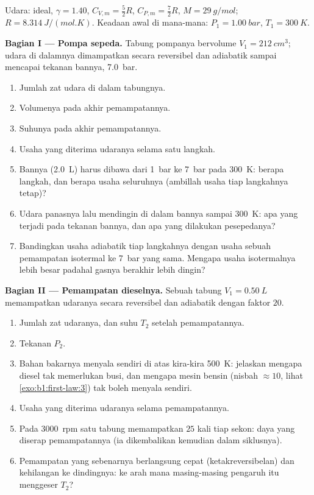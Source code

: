 \begin{problem}
\label{pb:b1:first-law:1}
Udara:  ideal, $\gamma = 1.40$, $C_{V,m} = \tfrac52 R$, $C_{P,m} =
\tfrac72 R$, $M = \qty{29}{g/mol}$; $R = \qty{8.314}{J/(mol.K)}$. Keadaan
awal di mana-mana: $P_1 = \qty{1.00}{bar}$, $T_1 = \qty{300}{K}$.

\medskip
\noindent\textbf{Bagian I --- Pompa sepeda.}
Tabung pompanya bervolume $V_1 = \qty{212}{cm^3}$; udara di dalamnya
dimampatkan secara reversibel dan adiabatik sampai mencapai tekanan
bannya, \qty{7.0}{bar}.
\begin{enumerate}
  \item Jumlah zat udara di dalam tabungnya.
  \item Volumenya pada akhir pemampatannya.
  \item Suhunya pada akhir pemampatannya.
  \item Usaha yang diterima udaranya selama satu langkah.
  \item Bannya (\qty{2.0}{L}) harus dibawa dari \qty{1}{bar} ke
        \qty{7}{bar} pada \qty{300}{K}: berapa langkah, dan berapa usaha
        seluruhnya (ambillah usaha tiap langkahnya tetap)?
  \item Udara panasnya lalu mendingin di dalam bannya sampai \qty{300}{K}: apa yang terjadi
        pada tekanan bannya, dan apa yang dilakukan pesepedanya?
  \item Bandingkan usaha adiabatik tiap langkahnya dengan usaha sebuah
        pemampatan isotermal ke \qty{7}{bar} yang sama. Mengapa usaha
        isotermalnya lebih besar padahal gasnya berakhir lebih dingin?
\end{enumerate}

\medskip
\noindent\textbf{Bagian II --- Pemampatan dieselnya.}
Sebuah tabung $V_1 = \qty{0.50}{L}$ memampatkan udaranya secara reversibel dan
adiabatik dengan faktor $20$.
\begin{enumerate}[resume]
  \item Jumlah zat udaranya, dan suhu $T_2$ setelah pemampatannya.
  \item Tekanan $P_2$.
  \item Bahan bakarnya menyala sendiri di atas kira-kira \qty{500}{K}: jelaskan mengapa
        diesel tak memerlukan busi, dan mengapa mesin bensin (nisbah
        $\approx 10$, lihat \cref{exo:b1:first-law:3}) tak boleh menyala sendiri.
  \item Usaha yang diterima udaranya selama pemampatannya.
  \item Pada \qty{3000}{rpm} satu tabung memampatkan $25$ kali tiap sekon:
        daya yang diserap pemampatannya (ia dikembalikan kemudian dalam
        siklusnya).
  \item Pemampatan yang sebenarnya berlangsung cepat (ketakreversibelan) dan kehilangan  ke
        dindingnya: ke arah mana masing-masing pengaruh itu menggeser $T_2$?
\end{enumerate}


\end{problem}
